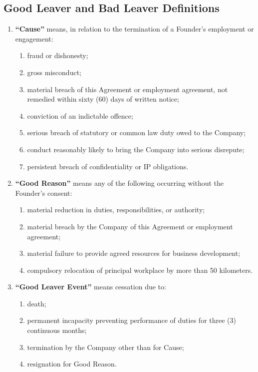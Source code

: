 \subsection{Good Leaver and Bad Leaver Definitions}
\begin{enumerate}[label=(\alph*)]
\item \textbf{``Cause''} means, in relation to the termination of a Founder's employment or engagement:
    \begin{enumerate}[label=(\roman*)]
    \item fraud or dishonesty;
    \item gross misconduct;
    \item material breach of this Agreement or employment agreement, not remedied within sixty (60) days of written notice;
    \item conviction of an indictable offence;
    \item serious breach of statutory or common law duty owed to the Company;
    \item conduct reasonably likely to bring the Company into serious disrepute;
    \item persistent breach of confidentiality or IP obligations.
    \end{enumerate}

\item \textbf{``Good Reason''} means any of the following occurring without the Founder's consent:
    \begin{enumerate}[label=(\roman*)]
    \item material reduction in duties, responsibilities, or authority;
    \item material breach by the Company of this Agreement or employment agreement;
    \item material failure to provide agreed resources for business development;
    \item compulsory relocation of principal workplace by more than 50 kilometers.
    \end{enumerate}

\item \textbf{``Good Leaver Event''} means cessation due to:
    \begin{enumerate}[label=(\roman*)]
    \item death;
    \item permanent incapacity preventing performance of duties for three (3) continuous months;
    \item termination by the Company other than for Cause;
    \item resignation for Good Reason.
    \end{enumerate}


\end{enumerate}
